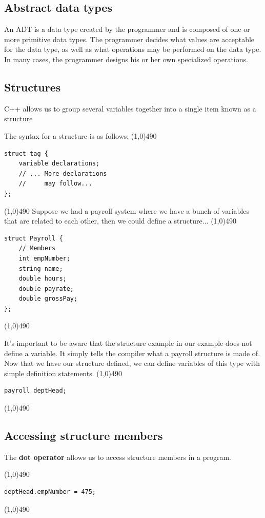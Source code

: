 \documentclass{report}
\begin{document}
	\bigbreak \noindent 
	\subsection{Abstract data types}
	\bigbreak \noindent 
	An ADT is a data type created by the programmer and is composed of one or more primitive data types. The programmer decides what values are acceptable for the data type, as well as what operations may be performed on the data type. In many cases, the programmer designs his or her own specialized operations.

	\bigbreak \noindent 
	\subsection{Structures}
	\bigbreak \noindent 
	\begin{concept}
	    C++ allows us to group several variables together into a single item known as a structure
	\end{concept}
	\bigbreak \noindent 
	The syntax for a structure is as follows:
	\bigbreak \noindent 
	\line(1,0){490}
	\begin{verbatim}
struct tag {
    variable declarations;
    // ... More declarations 
    //     may follow...
};
	\end{verbatim}
	\line(1,0){490}
	\bigbreak \noindent 
	Suppose we had a payroll system where we have a bunch of variables that are related to each other, then we could define a structure...
	\bigbreak \noindent 
	\line(1,0){490}
	\begin{verbatim}
struct Payroll {
    // Members
    int empNumber;
    string name;
    double hours;
    double payrate;
    double grossPay;
};
	\end{verbatim}
	\line(1,0){490}
	\bigbreak \noindent 

    \bigbreak \noindent 
	It's important to be aware that the structure example in our example does not define a variable. It simply tells the compiler what a payroll structure is made of.
	\bigbreak \noindent 
	Now that we have our structure defined, we can define variables of this type with simple definition statements.
	\bigbreak \noindent 
	\line(1,0){490}
	\begin{verbatim}
payroll deptHead;
	\end{verbatim}
	\line(1,0){490}

	\bigbreak \noindent 
	\subsection{Accessing structure members}
	\bigbreak \noindent 
	\begin{concept}
	    The \textbf{dot operator} allows us to access structure members in a program.
	\end{concept}
	\bigbreak \noindent 
	\line(1,0){490}
	\begin{verbatim}
deptHead.empNumber = 475;
	\end{verbatim}
	\line(1,0){490}
\end{document}
